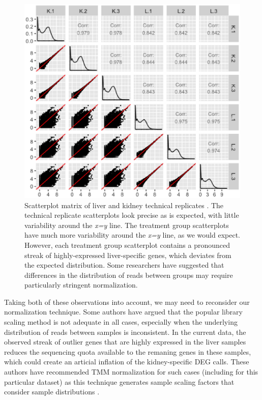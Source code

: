 \documentclass{bioinfo}
\begin{document}
\begin{figure}
\includegraphics[width=1\linewidth]{lkSM.eps}
\caption{Scatterplot matrix of liver and kidney technical replicates \citep{Marioni}. The technical replicate scatterplots look precise as is expected, with little variability around the \textit{x=y} line. The treatment group scatterplots have much more variability around the \textit{x=y} line, as we would expect. However, each treatment group scatterplot contains a pronounced streak of highly-expressed liver-specific genes, which deviates from the expected distribution. Some researchers have suggested that differences in the distribution of reads between groups may require particularly stringent normalization.
\label{lkSM}}
\end{figure}

Taking both of these observations into account, we may need to reconsider our normalization technique. Some authors have argued that the popular library scaling method is not adequate in all cases, especially when the underlying distribution of reads between samples is inconsistent. In the current data, the observed streak of outlier genes that are highly expressed in the liver samples reduces the sequencing quota available to the remaning genes in these samples, which could create an articial inflation of the kidney-specific DEG calls. These authors have recommended TMM normalization for such cases (including for this particular dataset) as this technique generates sample scaling factors that consider sample distributions \citep{RobinsonOshlack}.
\end{document}
